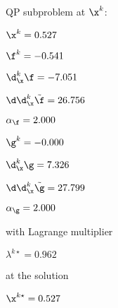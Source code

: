 QP subproblem at $\x^{k}$:

\bigskip
$\x^k=   0.527$


$\f^k =  -0.541$

$\d^k_{\x} \f =  -7.051$

$\d\d^k_{\x} \tilde \f =  26.756$

$\alpha_{\footnotesize\f} =   2.000$

\bigskip
$\g^k =  -0.000$

$\d^k_{\x}\g =   7.326$

$\d\d^k_{\x} \tilde \g =  27.799$

$\alpha_{\footnotesize\g} =   2.000$

\bigskip
with Lagrange multiplier

$\lambda^{k\star} =   0.962$

at the solution

$\x^{k\star} =   0.527$

